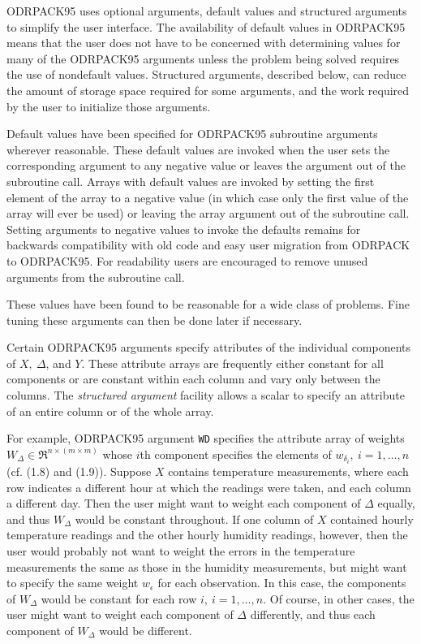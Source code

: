 \bigskip{}
\medskip 
\noindent ODRPACK95 uses optional arguments, default values and structured
arguments to simplify the user interface. The availability of default
values in ODRPACK95 means that the user does not have to be concerned
with determining values for many of the ODRPACK95 arguments unless the
problem being solved requires the use of nondefault values. Structured
arguments, described below, can reduce the amount of storage space
required for some arguments, and the work required by the user to
initialize those arguments.

\bigskip{}
\medskip
\noindent Default values have been specified for ODRPACK95 subroutine
arguments wherever reasonable. These default values are invoked when the
user sets the corresponding argument to any negative value or leaves the
argument out of the subroutine call. Arrays with default values are
invoked by setting the first element of the array to a negative value
(in which case only the first value of the array will ever be used)
or leaving the array argument out of the subroutine call.  Setting arguments to
negative values to invoke the defaults remains for backwards compatibility with
old code and easy user migration from ODRPACK to ODRPACK95.  For readability
users are encouraged to remove unused arguments from the subroutine call.

 These values have been found to be reasonable for a wide class of problems. Fine tuning these arguments can then be done later if necessary.

\bigskip{}
\medskip
\noindent Certain ODRPACK95 arguments specify attributes of the individual components of $X,\ \Delta$, and $Y$. These attribute arrays are frequently either constant for all components or are constant within each column and vary only between the columns. The {\it structured argument} facility allows a scalar to specify an attribute of an entire column or of the whole array.

\noindent For example, ODRPACK95 argument {\tt WD} specifies the attribute array of weights $W_{\Delta}\in\Re^{n\times(m\times m)}$ whose $i$th component specifies the elements of $w_{\delta_{i}},\ i=1,\ldots,n$ (cf. (1.8) and (1.9)). Suppose $X$ contains temperature measurements, where each row indicates a different hour at which the readings were taken, and each column a different day. Then the user might want to weight each component of $\Delta$ equally, and thus $W_{\Delta}$ would be constant throughout. If one column of $X$ contained hourly temperature readings and the other hourly humidity readings, however, then the user would probably not want to weight the errors in the temperature measurements the same as those in the humidity measurements, but might want to specify the same weight $w_\epsilon$ for each observation. In this case, the components of $W_{\Delta}$ would be constant for each row $i,\ i=1,\ldots,n$. Of course, in other cases, the user might want to weight each component of $\Delta$ differently, and thus each component of $W_{\Delta}$ would be different.

